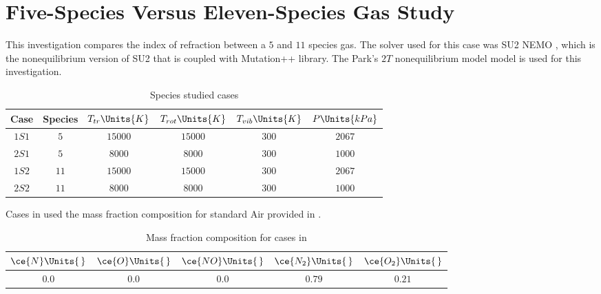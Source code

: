 \section{Five-Species Versus Eleven-Species Gas Study\label{ch4:speciesStudy}}
    This investigation compares the index of refraction between a $5$ and $11$
    species gas. The solver used for this case was \gls{SU2} \gls{NEMO}
    \cite{Maier2021}, which is the nonequilibrium version of \gls{SU2} that is
    coupled with \gls{Mutation++} \cite{Scoggins2014} library. The
    Park's $2T$ nonequilibrium model \cite{Park1989} model is used for this
    investigation. 

    \begin{table}[H]
        \centering
        \begin{tabular}{|c|c|c|c|c|c|}
            \hline
            Case & Species & $T_{tr}\Units{K}$ & $T_{rot}\Units{K}$ &
            $T_{vib}\Units{K}$ & $P\Units{kPa}$ \\
            \hline \hline
            $1S1$\cite{Gimelshein2022} & $5$ & $15000$ & $15000$ & $300$ & $2067$
            \\ \hline
            $2S1$ & $5$ & $8000$ & $8000$ & $300$ & $1000$     \\ \hline
            $1S2$ & $11$ & $15000$ & $15000$ & $300$ & $2067$  \\ \hline
            $2S2$ & $11$ & $8000$ & $8000$ & $300$ & $1000$    \\ \hline
        \end{tabular}
        \caption{Species studied cases}\label{tab:speciesStudyCases}
    \end{table}

    Cases in  used the mass fraction
    composition for standard Air provided in
    .
    \begin{table}[H]
        \centering
        \begin{tabular}{|c|c|c|c|c|}
            \hline
            $\ce{N}\Units{\,}$ & $\ce{O}\Units{\,}$ & $\ce{NO}\Units{\,}$ & $\ce{N_2}\Units{\,}$ &
            $\ce{O_2}\Units{\,}$ \\ \hline\hline
            $0.0$ & $0.0$ & $0.0$ & $0.79$ & $0.21$ \\ \hline
        \end{tabular}
        \caption{Mass fraction composition for cases in
        \label{tab:speciesStudyMassFraction}}
    \end{table}

